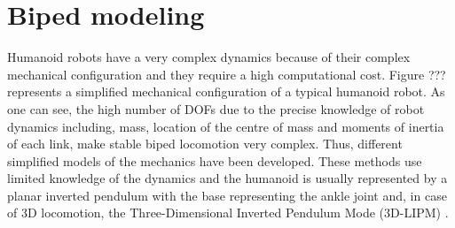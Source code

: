 \section{Biped modeling}
Humanoid robots have a very complex dynamics because of their complex mechanical configuration and they require a high computational cost. Figure ??? represents a simplified mechanical configuration of a typical humanoid robot. As one can see, the high number of DOFs due to the precise knowledge of robot dynamics including, mass, location of the centre of mass and moments of inertia of each link, make stable biped locomotion very complex. Thus, different simplified models of the mechanics have been developed. These methods use limited knowledge of the dynamics and the humanoid is usually represented by a planar inverted pendulum with the base representing the ankle joint and, in case of 3D locomotion, the Three-Dimensional Inverted Pendulum Mode (3D-LIPM) \cite{Kaj2001}.
